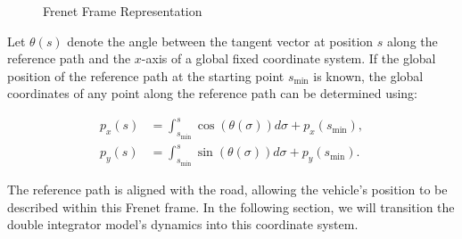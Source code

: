 \begin{figure}[h]
	\centering
	\caption{Frenet Frame Representation}
	\label{fig:frenet_frame}
\end{figure}

Let $\theta(s)$ denote the angle between the tangent vector at position $s$ along the reference path and the $x$-axis of a global fixed coordinate
system.
If the global position of the reference path at the starting point $s_{\min}$ is known, the global coordinates of any point along the reference path can be determined using:

\begin{align}
	p_x(s) & = \int_{s_{\min}}^{s} \cos(\theta(\sigma)) d\sigma + p_x(s_{\min}), \\
	p_y(s) & = \int_{s_{\min}}^{s} \sin(\theta(\sigma)) d\sigma + p_y(s_{\min}).
\end{align}

The reference path is aligned with the road, allowing the vehicle's position to be described within this Frenet frame.
In the following section, we will transition the double integrator model's dynamics into this coordinate system.

